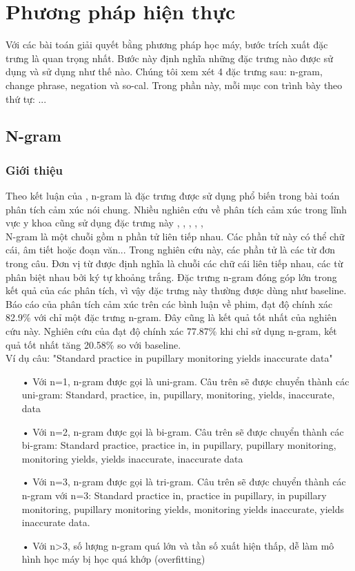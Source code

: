 \section{Phương pháp hiện thực}
Với các bài toán giải quyết bằng phương pháp học máy, bước trích xuất đặc trưng là quan trọng nhất. Bước này định nghĩa những đặc trưng nào được sử dụng và sử dụng như thế nào. Chúng tôi xem xét 4 đặc trưng sau: n-gram, change phrase, negation và so-cal. Trong phần này, mỗi mục con trình bày theo thứ tự: ...
\subsection{N-gram}
\subsubsection*{Giới thiệu}
Theo kết luận của \cite{chandrakala2012opinion}, n-gram là đặc trưng được sử dụng phổ biến trong bài toán phân tích cảm xúc nói chung. Nhiều nghiên cứu về phân tích cảm xúc trong lĩnh vực y khoa cũng sử dụng đặc trưng này \cite{pang2002thumbs}, \cite{niu2005analysis}, \cite{sarker2011outcome}, \cite{niu2006using}, \cite{pestian2012sentie}, \cite{xia09improving} \\

N-gram là một chuỗi gồm n phần tử liên tiếp nhau. Các phần tử này có thể chữ cái, âm tiết hoặc đoạn văn... Trong nghiên cứu này, các phần tử là các từ đơn trong câu. Đơn vị từ được định nghĩa là chuỗi các chữ cái liên tiếp nhau, các từ phân biệt nhau bởi ký tự khoảng trắng. Đặc trưng n-gram đóng góp lớn trong kết quả của các phân tích, vì vậy đặc trưng này thường được dùng như baseline. Báo cáo  của \cite{pang2002thumbs} phân tích cảm xúc trên các bình luận về phim, đạt độ chính xác 82.9\% với chỉ một đặc trưng n-gram. Đây cũng là kết quả tốt nhất của nghiên cứu này. Nghiên cứu của \cite{niu2005analysis} đạt độ chính xác 77.87\% khi chỉ sử dụng n-gram, kết quả tốt nhất tăng 20.58\% so với baseline. \\

Ví dụ câu: "Standard practice in pupillary monitoring yields inaccurate data"
\begin{itemize}
\item[•]Với n=1, n-gram được gọi là uni-gram. Câu trên sẽ được chuyển thành các uni-gram: Standard, practice, in, pupillary, monitoring, yields, inaccurate, data
\item[•]Với n=2, n-gram được gọi là bi-gram. Câu trên sẽ được chuyển thành các bi-gram: Standard practice, practice in, in pupillary, pupillary monitoring, monitoring yields, yields inaccurate, inaccurate data
\item[•]Với n=3, n-gram được gọi là tri-gram. Câu trên sẽ được chuyển thành các n-gram với n=3: Standard practice in, practice in pupillary, in pupillary monitoring, pupillary monitoring yields, monitoring yields inaccurate, yields inaccurate data.
\item[•]Với n>3, số lượng n-gram quá lớn và tần số xuất hiện thấp, dễ làm mô hình học máy bị học quá khớp (overfitting)
\end{itemize}

